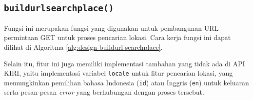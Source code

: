 \subsection{\texttt{build\textunderscore url\textunderscore searchplace()}}
\label{sec:design-code-buildurl-searchplace}

Fungsi ini merupakan fungsi yang digunakan untuk pembangunan URL permintaan	GET untuk proses pencarian lokasi. Cara kerja fungsi ini dapat dilihat di Algoritma \ref{alg:design-buildurl-searchplace}.
	
	Selain itu, fitur ini juga memiliki implementasi tambahan yang tidak ada di API KIRI, yaitu implementasi variabel \verb|locale| untuk fitur pencarian lokasi, yang memungkinkan pemilihan bahasa Indonesia (\verb|id|) atau Inggris (\verb|en|) untuk keluaran serta pesan-pesan \textit{error} yang berhubungan dengan proses tersebut.


